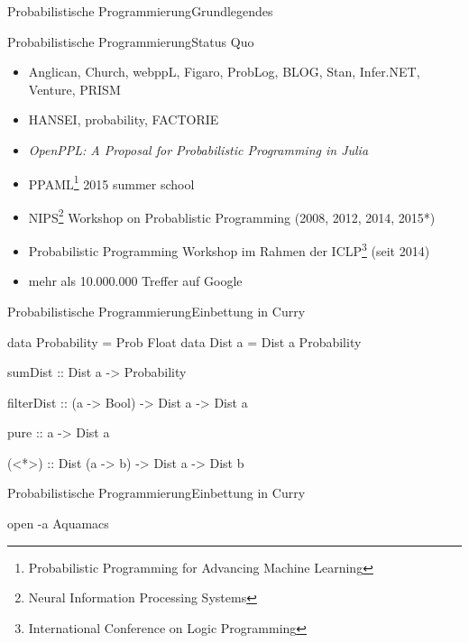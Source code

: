 \documentclass{beamer}
\begin{document}
\begin{frame}{Probabilistische Programmierung}{Grundlegendes}
\begin{minipage}{0.7\textwidth}
{}
\end{minipage}

\end{frame}


\begin{frame}{Probabilistische Programmierung}{Status Quo}
\begin{itemize}
\item Anglican, Church, webppL, Figaro, ProbLog, BLOG, Stan, Infer.NET, Venture, PRISM
\item HANSEI, probability, FACTORIE
\end{itemize}
\vfill
\begin{itemize}
\item \emph{OpenPPL: A Proposal for Probabilistic Programming in Julia}
\item PPAML\footnote{Probabilistic Programming for Advancing Machine Learning} 2015 summer school
\item NIPS\footnote{Neural Information Processing Systems} Workshop on Probablistic Programming (2008, 2012, 2014, 2015*)
\item Probabilistic Programming Workshop im Rahmen der ICLP\footnote{International Conference on Logic Programming} (seit 2014)
\item mehr als 10.000.000 Treffer auf Google
\end{itemize}
\end{frame}


\begin{frame}[fragile]{Probabilistische Programmierung}{Einbettung in Curry}

\small
\begin{semiverbatim}
data Probability = Prob Float
data Dist a      = Dist a Probability

sumDist :: Dist a -> Probability

filterDist :: (a -> Bool) -> Dist a -> Dist a

pure :: a -> Dist a

(<*>) :: Dist (a -> b) -> Dist a -> Dist b
\end{semiverbatim}

\end{frame}

\begin{frame}[fragile]{Probabilistische Programmierung}{Einbettung in
    Curry}
\begin{semiverbatim}

open -a Aquamacs

\end{semiverbatim}

\end{frame}
\end{document}
